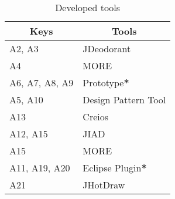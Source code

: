 \begin{table}[!htbp]
\caption{Developed tools}%
\label{tab-tools}
\begin{tabularx}{\textwidth}{X X}
\toprule%
\multicolumn{1}{c}{\textbf{Keys}}      &
\multicolumn{1}{c}{\textbf{Tools}}   \\      
\midrule%
A2, A3         & JDeodorant                   \\
A4             & MORE                         \\
A6, A7, A8, A9 & Prototype\textbf{*}          \\
A5, A10        & Design Pattern Tool          \\
A13            & Creios                       \\
A12, A15       & JIAD                         \\
A15            & MORE                         \\
A11, A19, A20  & Eclipse Plugin\textbf{*}     \\
A21            & JHotDraw                     \\
\bottomrule%
\end{tabularx}
\end{table}
\FloatBarrier